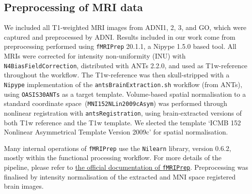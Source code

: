 \documentclass{article}
\begin{document}
\subsection{Preprocessing of MRI data}\label{apd:preprocessing}
We included all T1-weighted MRI images from ADNI1, 2, 3, and GO, which were captured and preprocessed by ADNI.
Results included in our work come from preprocessing performed using \texttt{fMRIPrep} 20.1.1, a Nipype 1.5.0 based tool.
All MRIs were corrected for intensity non-uniformity (INU) with \texttt{N4BiasFieldCorrection}, distributed with ANTs 2.2.0, and used as T1w-reference throughout the workflow.
The T1w-reference was then skull-stripped with a \texttt{Nipype} implementation of
the \texttt{antsBrainExtraction.sh} workflow (from ANTs), using \texttt{OASIS30ANTs} as a target template.
Volume-based spatial normalisation to a standard coordinate space~(\texttt{MNI152NLin2009cAsym}) was performed through
nonlinear registration with \texttt{antsRegistration}, using brain-extracted versions of both T1w reference and the T1w template.
We slected the template `ICMB 152 Nonlinear Asymmetrical Template Version 2009c' for spatial normalisation.

Many internal operations of \texttt{fMRIPrep} use the
\texttt{Nilearn} library, version 0.6.2, %
mostly within the functional processing workflow.
For more details of the pipeline, please refer to \href{https://fMRIPrep.readthedocs.io/en/latest/workflows.html}{the official documentation of \texttt{fMRIPrep}}. Preprocessing was finalised by intensity normalisation of the extracted and MNI space registered brain images. %
\end{document}
